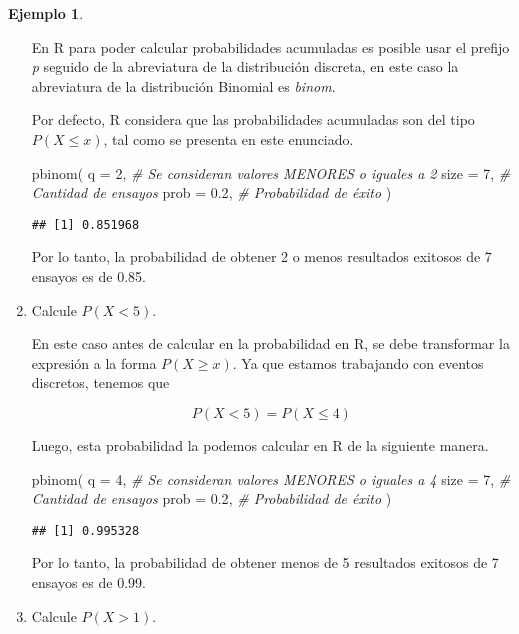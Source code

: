 \documentclass[
]{book}
\newenvironment{Shaded}{\begin{snugshade}}{\end{snugshade}}
\newcommand{\AttributeTok}[1]{\textcolor[rgb]{0.77,0.63,0.00}{#1}}
\newcommand{\CommentTok}[1]{\textcolor[rgb]{0.56,0.35,0.01}{\textit{#1}}}
\newcommand{\DecValTok}[1]{\textcolor[rgb]{0.00,0.00,0.81}{#1}}
\newcommand{\FloatTok}[1]{\textcolor[rgb]{0.00,0.00,0.81}{#1}}
\newcommand{\FunctionTok}[1]{\textcolor[rgb]{0.00,0.00,0.00}{#1}}
\newcommand{\NormalTok}[1]{#1}
\theoremstyle{definition}
\theoremstyle{definition}
\newtheorem{example}{Ejemplo}[chapter]
\theoremstyle{definition}
\theoremstyle{definition}
\theoremstyle{remark}
\begin{document}
\begin{example}
\begin{enumerate}
  En R para poder calcular probabilidades acumuladas es posible usar el prefijo \emph{p} seguido de la abreviatura de la distribución discreta, en este caso la abreviatura de la distribución Binomial es \emph{binom}.

  Por defecto, R considera que las probabilidades acumuladas son del tipo \(P(X \leq x)\), tal como se presenta en este enunciado.

\begin{Shaded}
\begin{Highlighting}[]
\FunctionTok{pbinom}\NormalTok{(}
  \AttributeTok{q =} \DecValTok{2}\NormalTok{, }\CommentTok{\# Se consideran valores MENORES o iguales a 2}
  \AttributeTok{size =} \DecValTok{7}\NormalTok{, }\CommentTok{\# Cantidad de ensayos}
  \AttributeTok{prob =} \FloatTok{0.2}\NormalTok{, }\CommentTok{\# Probabilidad de éxito}
\NormalTok{)}
\end{Highlighting}
\end{Shaded}

\begin{verbatim}
## [1] 0.851968
\end{verbatim}

  Por lo tanto, la probabilidad de obtener 2 o menos resultados exitosos de 7 ensayos es de 0.85.
\item
  Calcule \(P(X < 5)\).

  En este caso antes de calcular en la probabilidad en R, se debe transformar la expresión a la forma \(P(X \geq x)\). Ya que estamos trabajando con eventos discretos, tenemos que

  \[P(X < 5) = P(X \leq 4)\]

  Luego, esta probabilidad la podemos calcular en R de la siguiente manera.

\begin{Shaded}
\begin{Highlighting}[]
\FunctionTok{pbinom}\NormalTok{(}
  \AttributeTok{q =} \DecValTok{4}\NormalTok{, }\CommentTok{\# Se consideran valores MENORES o iguales a 4}
  \AttributeTok{size =} \DecValTok{7}\NormalTok{, }\CommentTok{\# Cantidad de ensayos}
  \AttributeTok{prob =} \FloatTok{0.2}\NormalTok{, }\CommentTok{\# Probabilidad de éxito}
\NormalTok{)}
\end{Highlighting}
\end{Shaded}

\begin{verbatim}
## [1] 0.995328
\end{verbatim}

  Por lo tanto, la probabilidad de obtener menos de 5 resultados exitosos de 7 ensayos es de 0.99.
\item
  Calcule \(P(X > 1)\).


\end{enumerate}
\end{example}
\end{document}
